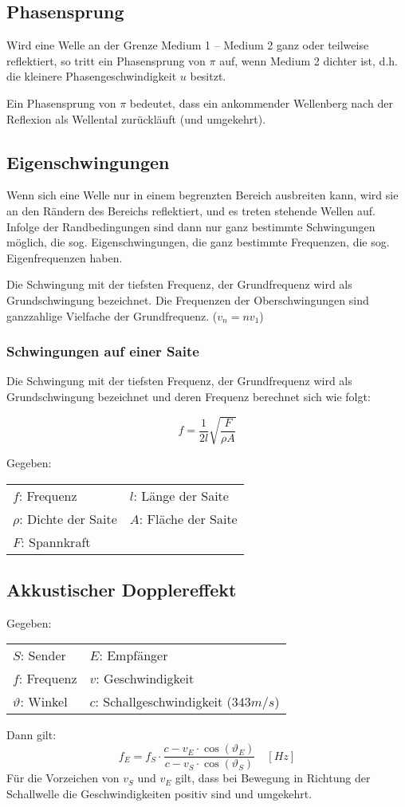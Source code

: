 \subsection{Phasensprung}

Wird eine Welle an der Grenze Medium 1 -- Medium 2 ganz oder teilweise
reflektiert, so tritt ein Phasensprung von $\pi$ auf, wenn Medium 2 dichter ist,
d.h. die kleinere Phasengeschwindigkeit $u$ besitzt.

Ein Phasensprung von $\pi$ bedeutet, dass ein ankommender Wellenberg nach der
Reflexion als Wellental zurückläuft (und umgekehrt).

\subsection{Eigenschwingungen}

Wenn sich eine Welle nur in einem begrenzten Bereich ausbreiten kann, wird sie
an den Rändern des Bereichs reflektiert, und es treten stehende Wellen auf. Infolge
der Randbedingungen sind dann nur ganz bestimmte Schwingungen möglich, die
sog. Eigenschwingungen, die ganz bestimmte Frequenzen, die sog. Eigenfrequenzen
haben.

Die Schwingung mit der tiefsten Frequenz, der Grundfrequenz wird als Grundschwingung bezeichnet. Die Frequenzen der Oberschwingungen sind
ganzzahlige Vielfache der Grundfrequenz. ($v_n = nv_1$)

\subsubsection{Schwingungen auf einer Saite}

Die Schwingung mit der tiefsten Frequenz, der Grundfrequenz wird als Grundschwingung bezeichnet und deren Frequenz berechnet sich wie folgt:

\[
		f = \frac{1}{2l} \sqrt{\frac{F}{\rho A}}
\]

Gegeben:

\begin{tabular}{ll}
$f$: Frequenz & $l$: Länge der Saite \\
$\rho$: Dichte der Saite & $A$: Fläche der Saite \\
$F$: Spannkraft
\end{tabular}

\subsection{Akkustischer Dopplereffekt}

Gegeben:

\begin{tabular}{ll}
$S$: Sender & $E$: Empfänger \\
$f$: Frequenz & $v$: Geschwindigkeit \\
$\vartheta$: Winkel & $c$: Schallgeschwindigkeit ($343 m/s$) \\
\end{tabular}

Dann gilt:
\[
	f_E = f_S \cdot \frac{c - v_E \cdot \cos(\vartheta_E)}{c - v_S \cdot \cos (\vartheta_S)}
	\quad \left[ Hz \right]
\]
Für die Vorzeichen von $v_S$ und $v_E$ gilt, dass bei Bewegung in Richtung der
Schallwelle die Geschwindigkeiten positiv sind und umgekehrt.
